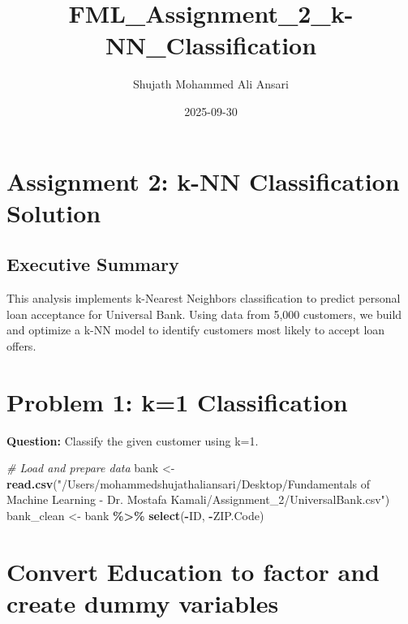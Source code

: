 \documentclass[
]{article}
\title{FML\_Assignment\_2\_k-NN\_Classification}
\author{Shujath Mohammed Ali Ansari}
\date{2025-09-30}
\newenvironment{Shaded}{\begin{snugshade}}{\end{snugshade}}
\newcommand{\CommentTok}[1]{\textcolor[rgb]{0.56,0.35,0.01}{\textit{#1}}}
\newcommand{\FunctionTok}[1]{\textcolor[rgb]{0.13,0.29,0.53}{\textbf{#1}}}
\newcommand{\NormalTok}[1]{#1}
\newcommand{\OtherTok}[1]{\textcolor[rgb]{0.56,0.35,0.01}{#1}}
\newcommand{\SpecialCharTok}[1]{\textcolor[rgb]{0.81,0.36,0.00}{\textbf{#1}}}
\newcommand{\StringTok}[1]{\textcolor[rgb]{0.31,0.60,0.02}{#1}}
\begin{document}
\maketitle

\section{Assignment 2: k-NN Classification
Solution}\label{assignment-2-k-nn-classification-solution}

\subsection{Executive Summary}\label{executive-summary}

This analysis implements k-Nearest Neighbors classification to predict
personal loan acceptance for Universal Bank. Using data from 5,000
customers, we build and optimize a k-NN model to identify customers most
likely to accept loan offers.

\section{Problem 1: k=1
Classification}\label{problem-1-k1-classification}

\textbf{Question:} Classify the given customer using k=1.

\begin{Shaded}
\begin{Highlighting}[]
\CommentTok{\# Load and prepare data}
\NormalTok{bank }\OtherTok{\textless{}{-}} \FunctionTok{read.csv}\NormalTok{(}\StringTok{"/Users/mohammedshujathaliansari/Desktop/Fundamentals of Machine Learning {-} Dr. Mostafa Kamali/Assignment\_2/UniversalBank.csv"}\NormalTok{)}
\NormalTok{bank\_clean }\OtherTok{\textless{}{-}}\NormalTok{ bank }\SpecialCharTok{\%\textgreater{}\%} \FunctionTok{select}\NormalTok{(}\SpecialCharTok{{-}}\NormalTok{ID, }\SpecialCharTok{{-}}\NormalTok{ZIP.Code)}
\end{Highlighting}
\end{Shaded}

\section{Convert Education to factor and create dummy
variables}\label{convert-education-to-factor-and-create-dummy-variables}
\end{document}

